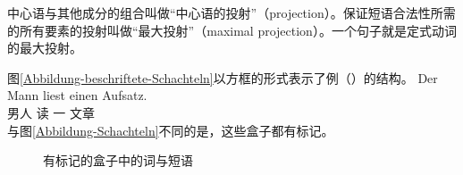 中心语与其他成分的组合叫做“中心语的投射”（projection）。保证短语合法性所需的所有要素的投射叫做“最大投射”（maximal projection）。一个句子就是定式动词的最大投射。

图\vref{Abbildung-beschriftete-Schachteln}以方框的形式表示了例（）的结构。
\ea
\gll Der Mann liest einen Aufsatz.\\
	   男人 读 一 文章\\
\z
与图\ref{Abbildung-Schachteln}不同的是，这些盒子都有标记。
\begin{figure}
\centering
{}
\caption{\label{Abbildung-beschriftete-Schachteln}有标记的盒子中的词与短语}
\end{figure}%

